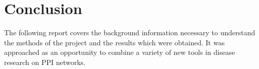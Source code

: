 


\section*{Conclusion}

The following report covers the background information necessary to understand the methods of the project and the results which were obtained.
It was approached as an opportunity to combine a variety of new tools in disease research on \ac{PPI} networks.
